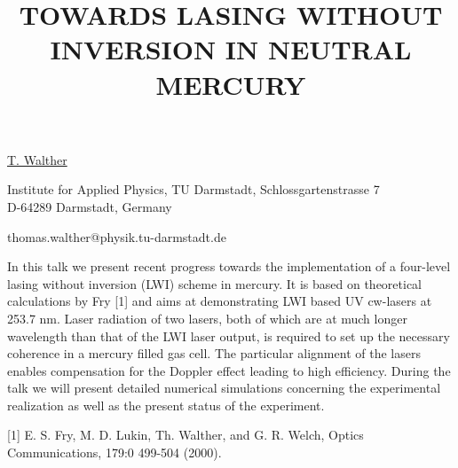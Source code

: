\title{TOWARDS LASING WITHOUT INVERSION IN NEUTRAL MERCURY}

\underline{T. Walther} 

{\normalsize{\vspace{-4mm}
Institute for Applied Physics, TU Darmstadt, Schlossgartenstrasse 7\\
D-64289 Darmstadt, Germany

\email thomas.walther@physik.tu-darmstadt.de}}

In this talk we present recent progress towards the implementation of a four-level lasing without inversion (LWI) scheme in mercury.
It is based on theoretical calculations by Fry [1] and aims at demonstrating LWI based UV cw-lasers at 253.7
nm. Laser radiation of two lasers, both of which are at much longer wavelength than that of the LWI laser output, is required to set
up the necessary coherence in a mercury filled gas cell. The particular alignment of the lasers enables compensation for the Doppler
effect leading to high efficiency. During the talk we will present detailed numerical simulations concerning the experimental
realization as well as the present status of the experiment.

{\normalsize
[1] E. S. Fry, M. D. Lukin, Th. Walther, and G. R. Welch, Optics Communications, 179:0 499-504 (2000).
}

\vspace{\baselineskip}
